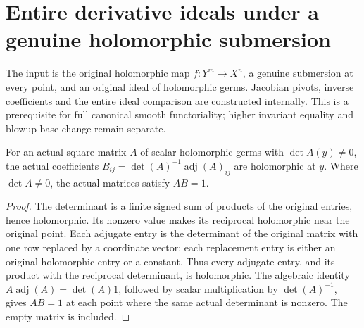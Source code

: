 \section{Entire derivative ideals under a genuine holomorphic submersion}

The input is the original holomorphic map $f:Y^m\to X^n$, a genuine
submersion at every point, and an original ideal of holomorphic germs.
Jacobian pivots, inverse coefficients and the entire ideal comparison are
constructed internally. This is a prerequisite for full canonical smooth
functoriality; higher invariant equality and blowup base change remain separate.

\begin{lemma}\label{hir:submersion-holomorphic-cramer-coefficients}
For an actual square matrix $A$ of scalar holomorphic germs with
$\det A(y)\ne0$, the actual coefficients
$B_{ij}=\det(A)^{-1}\operatorname{adj}(A)_{ij}$ are holomorphic at $y$.
Where $\det A\ne0$, the actual matrices satisfy $AB=1$.
\leanok
{}
\end{lemma}
\begin{proof}
The determinant is a finite signed sum of products of the original entries,
hence holomorphic. Its nonzero value makes its reciprocal holomorphic near
the original point. Each adjugate entry is the determinant of the original
matrix with one row replaced by a coordinate vector; each replacement entry
is either an original holomorphic entry or a constant. Thus every adjugate
entry, and its product with the reciprocal determinant, is holomorphic.
The algebraic identity $A\operatorname{adj}(A)=\det(A)1$, followed by
scalar multiplication by $\det(A)^{-1}$, gives $AB=1$ at each point where
the same actual determinant is nonzero. The empty matrix is included.
\end{proof}

